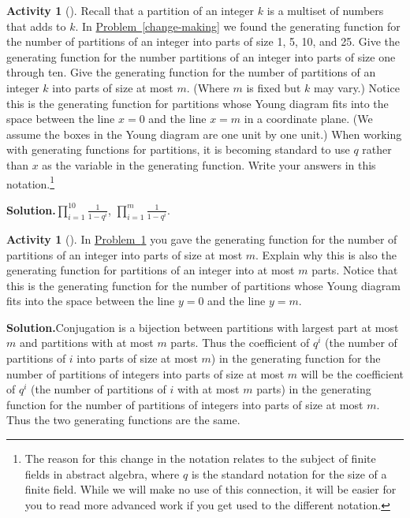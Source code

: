 \documentclass[10pt,]{book}
\theoremstyle{plain}
\theoremstyle{definition}
\newtheorem{activity}[project]{Activity}
\numberwithin{equation}{chapter}
\begin{document}
\begin{activity}[]\label{largestpartatmostm}
Recall that a partition of an integer \(k\) is a multiset of numbers that adds to \(k\). In \hyperref[change-making]{Problem~\ref{change-making}} we found the generating function for the number of partitions of an integer into parts of size 1, 5, 10, and 25. Give the generating function for the number partitions of an integer into parts of size one through ten. Give the generating function for the number of partitions of an integer \(k\) into parts of size at most \(m\). (Where \(m\) is fixed but \(k\) may vary.) Notice this is the generating function for partitions whose Young diagram fits into the space between the line \(x=0\) and the line \(x=m\) in a coordinate plane. (We assume the boxes in the Young diagram are one unit by one unit.) When working with generating functions for partitions, it is becoming standard to use \(q\) rather than \(x\) as the variable in the generating function.  Write your answers in this notation.\footnote{The reason for this change in the notation relates to the subject of finite fields in abstract algebra, where \(q\) is the standard notation for the size of a finite field.  While we will make no use of this connection, it will be easier for you to read more advanced work if you get used to the different notation.\label{fn-12}}%
\par\medskip\noindent%
\textbf{Solution.}\quad \(\prod_{i=1}^{10}\frac{1}{1-q^i}\), \(\prod_{i=1}^m\frac{1}{1-q^i}\).%
\end{activity}
\begin{activity}[]\label{atmostmparts}
In \hyperref[largestpartatmostm]{Problem~\ref{largestpartatmostm}} you gave the generating function for the number of partitions of an integer into parts of size at most \(m\). Explain why this is also the generating function for partitions of an integer into at most \(m\) parts. Notice that this is the generating function for the number of partitions whose Young diagram fits into the space between the line \(y=0\) and the line \(y=m\).%
\par\medskip\noindent%
\textbf{Solution.}\quad Conjugation is a bijection between partitions with largest part at most \(m\) and partitions with at most \(m\) parts. Thus the coefficient of \(q^i\) (the number of partitions of \(i\) into parts of size at most \(m\)) in the generating function for the number of partitions of integers into parts of size at most \(m\) will be the coefficient of \(q^i\) (the number of partitions of \(i\) with at most \(m\) parts) in the generating function for the number of partitions of integers into parts of size at most \(m\). Thus the two generating functions are the same.%
\end{activity}
\end{document}
